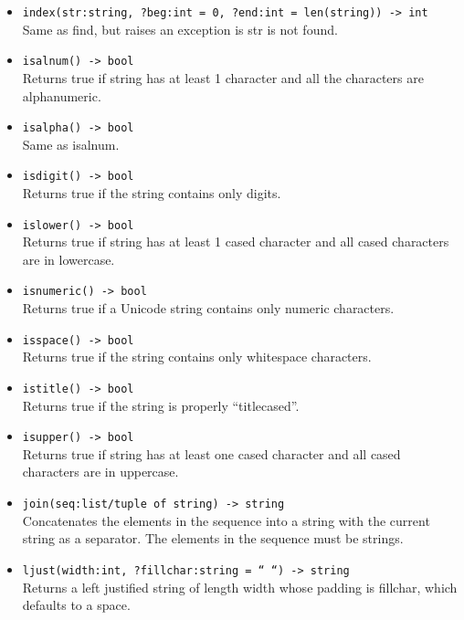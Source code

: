 \documentclass{article}
\begin{document}
\begin{itemize}
\item \verb|index(str:string, ?beg:int = 0, ?end:int = len(string)) -> int| \\
    Same as find, but raises an exception is str is not found. 

\item \verb|isalnum() -> bool| \\
Returns true if string has at least 1 character and all the characters are alphanumeric. 

\item \verb|isalpha() -> bool| \\
    Same as isalnum. 

\item \verb|isdigit() -> bool| \\
    Returns true if the string contains only digits.

\item \verb|islower() -> bool| \\
Returns true if string has at least 1 cased character and all cased characters are in lowercase. 

\item \verb|isnumeric() -> bool| \\
    Returns true if a Unicode string contains only numeric characters. 

\item \verb|isspace() -> bool| \\
    Returns true if the string contains only whitespace characters. 

\item \verb|istitle() -> bool| \\
    Returns true if the string is properly “titlecased”. 

\item \verb|isupper() -> bool| \\
Returns true if string has at least one cased character and all cased characters are in uppercase. 

\item \verb|join(seq:list/tuple of string) -> string| \\
Concatenates the elements in the sequence into a string with the current string as a separator. The elements in the sequence must be strings. 

\item \verb|ljust(width:int, ?fillchar:string = “ “) -> string| \\
Returns a left justified string of length width whose padding is fillchar, which defaults to a space. 


\end{itemize}
\end{document}

